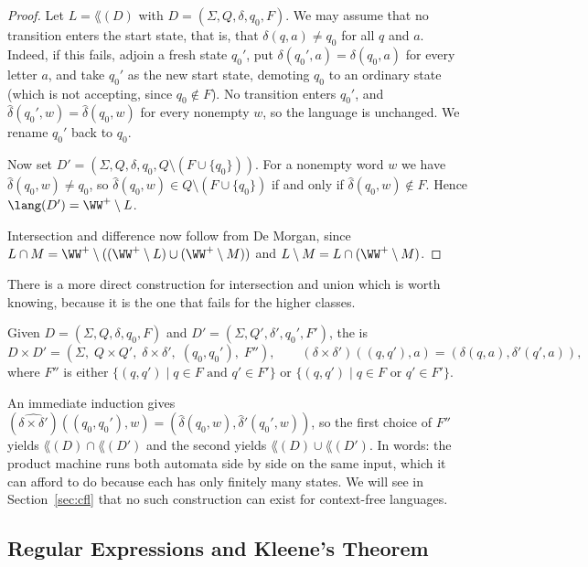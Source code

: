 \begin{proof}
	Let $L = \lang(D)$ with $D = (\Sigma, Q, \delta, q_0, F)$. We may assume that no transition enters the start state, that is, that $\delta(q,a) \neq q_0$ for all $q$ and $a$. Indeed, if this fails, adjoin a fresh state $q_0'$, put $\delta(q_0',a) = \delta(q_0,a)$ for every letter $a$, and take $q_0'$ as the new start state, demoting $q_0$ to an ordinary state (which is not accepting, since $q_0 \notin F$). No transition enters $q_0'$, and $\hat\delta(q_0',w) = \hat\delta(q_0,w)$ for every nonempty $w$, so the language is unchanged. We rename $q_0'$ back to $q_0$.

	Now set $D' = (\Sigma, Q, \delta, q_0, Q \setminus (F \cup \{q_0\}))$. For a nonempty word $w$ we have $\hat\delta(q_0,w) \neq q_0$, so $\hat\delta(q_0,w) \in Q \setminus (F \cup \{q_0\})$ if and only if $\hat\delta(q_0,w) \notin F$. Hence $\lang(D') = \WW^+ \setminus L$.

	Intersection and difference now follow from De Morgan, since $L \cap M = \WW^+ \setminus ((\WW^+ \setminus L) \cup (\WW^+ \setminus M))$ and $L \setminus M = L \cap (\WW^+ \setminus M)$.
\end{proof}

There is a more direct construction for intersection and union which is worth knowing, because it is the one that fails for the higher classes.

\begin{definition}
	Given $D = (\Sigma, Q, \delta, q_0, F)$ and $D' = (\Sigma, Q', \delta', q_0', F')$, the  is
	$$D \times D' = (\Sigma,\; Q \times Q',\; \delta \times \delta',\; (q_0,q_0'),\; F''), \qquad (\delta\times\delta')((q,q'),a) = (\delta(q,a), \delta'(q',a)),$$
	where $F''$ is either $\{(q,q') \mid q \in F \text{ and } q' \in F'\}$ or $\{(q,q') \mid q \in F \text{ or } q' \in F'\}$.
\end{definition}

An immediate induction gives $(\widehat{\delta\times\delta'})((q_0,q_0'),w) = (\hat\delta(q_0,w), \hat\delta'(q_0',w))$, so the first choice of $F''$ yields $\lang(D)\cap\lang(D')$ and the second yields $\lang(D)\cup\lang(D')$. In words: the product machine runs both automata side by side on the same input, which it can afford to do because each has only finitely many states. We will see in Section~\ref{sec:cfl} that no such construction can exist for context-free languages.

\subsection{Regular Expressions and Kleene's Theorem}

